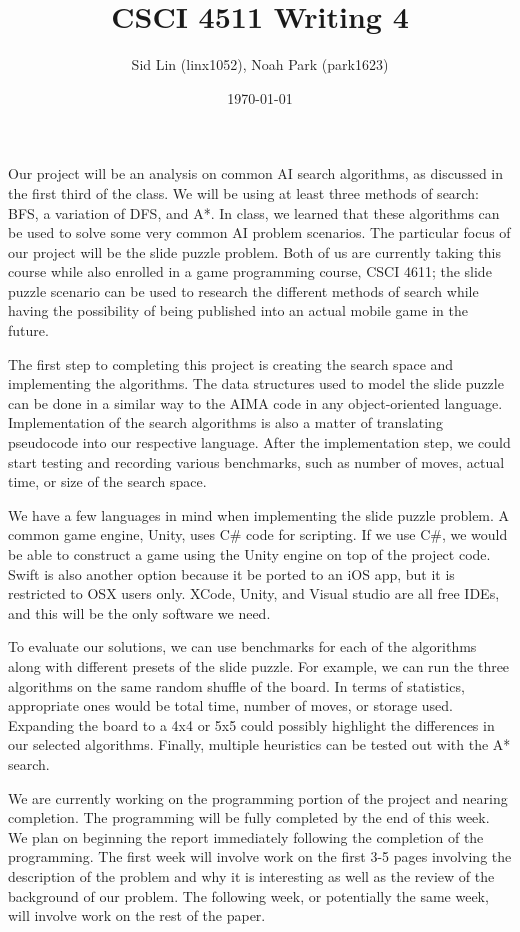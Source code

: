 \documentclass{article}
\title{CSCI 4511 Writing 4}
\date{\today}
\author{Sid Lin (linx1052), Noah Park (park1623)}
\begin{document}
\maketitle

Our project will be an analysis on common AI search algorithms, as discussed in the first third of the class. We will be using at least three methods of search: BFS, a variation of DFS, and A*. In class, we learned that these algorithms can be used to solve some very common AI problem scenarios. The particular focus of our project will be the slide puzzle problem. Both of us are currently taking this course while also enrolled in a game programming course, CSCI 4611; the slide puzzle scenario can be used to research the different methods of search while having the possibility of being published into an actual mobile game in the future. 
\newline

The first step to completing this project is creating the search space and implementing the algorithms. The data structures used to model the slide puzzle can be done in a similar way to the AIMA code in any object-oriented language. Implementation of the search algorithms is also a matter of translating pseudocode into our respective language. After the implementation step, we could start testing and recording various benchmarks, such as number of moves, actual time, or size of the search space.
\newline

We have a few languages in mind when implementing the slide puzzle problem. A common game engine, Unity, uses C\# code for scripting. If we use C\#, we would be able to construct a game using the Unity engine on top of the project code. Swift is also another option because it be ported to an iOS app, but it is restricted to OSX users only. XCode, Unity, and Visual studio are all free IDEs, and this will be the only software we need.
\newline

To evaluate our solutions, we can use benchmarks for each of the algorithms along with different presets of the slide puzzle. For example, we can run the three algorithms on the same random shuffle of the board. In terms of statistics, appropriate ones would be total time, number of moves, or storage used. Expanding the board to a 4x4 or 5x5 could possibly highlight the differences in our selected algorithms. Finally, multiple heuristics can be tested out with the A* search.
\newline

We are currently working on the programming portion of the project and nearing completion. The programming will be fully completed by the end of this week. We plan on beginning the report immediately following the completion of the programming. The first week will involve work on the first 3-5 pages involving the description of the problem and why it is interesting as well as the review of the background of our problem. The following week, or potentially the same week, will involve work on the rest of the paper.
\end{document}
